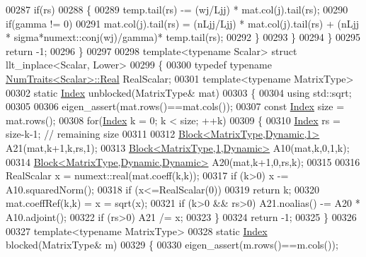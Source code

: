 \begin{DoxyCode}
00287       \textcolor{keywordflow}{if}(rs)
00288       \{
00289         temp.tail(rs) -= (wj/Ljj) * mat.col(j).tail(rs);
00290         \textcolor{keywordflow}{if}(gamma != 0)
00291           mat.col(j).tail(rs) = (nLjj/Ljj) * mat.col(j).tail(rs) + (nLjj * sigma*numext::conj(wj)/gamma)*
      temp.tail(rs);
00292       \}
00293     \}
00294   \}
00295   \textcolor{keywordflow}{return} -1;
00296 \}
00297 
00298 \textcolor{keyword}{template}<\textcolor{keyword}{typename} Scalar> \textcolor{keyword}{struct }llt\_inplace<Scalar, Lower>
00299 \{
00300   \textcolor{keyword}{typedef} \textcolor{keyword}{typename} \hyperlink{group___core___module_struct_eigen_1_1_num_traits}{NumTraits<Scalar>::Real} RealScalar;
00301   \textcolor{keyword}{template}<\textcolor{keyword}{typename} MatrixType>
00302   \textcolor{keyword}{static} \hyperlink{group___cholesky___module_ac7a64274814fa76e8b1e9e945546037f}{Index} unblocked(MatrixType& mat)
00303   \{
00304     \textcolor{keyword}{using} std::sqrt;
00305 
00306     eigen\_assert(mat.rows()==mat.cols());
00307     \textcolor{keyword}{const} \hyperlink{group___cholesky___module_ac7a64274814fa76e8b1e9e945546037f}{Index} size = mat.rows();
00308     \textcolor{keywordflow}{for}(\hyperlink{group___cholesky___module_ac7a64274814fa76e8b1e9e945546037f}{Index} k = 0; k < size; ++k)
00309     \{
00310       \hyperlink{group___cholesky___module_ac7a64274814fa76e8b1e9e945546037f}{Index} rs = size-k-1; \textcolor{comment}{// remaining size}
00311 
00312       \hyperlink{group___core___module_class_eigen_1_1_block}{Block<MatrixType,Dynamic,1>} A21(mat,k+1,k,rs,1);
00313       \hyperlink{group___core___module_class_eigen_1_1_block}{Block<MatrixType,1,Dynamic>} A10(mat,k,0,1,k);
00314       \hyperlink{group___core___module_class_eigen_1_1_block}{Block<MatrixType,Dynamic,Dynamic>} A20(mat,k+1,0,rs,k);
00315 
00316       RealScalar x = numext::real(mat.coeff(k,k));
00317       \textcolor{keywordflow}{if} (k>0) x -= A10.squaredNorm();
00318       \textcolor{keywordflow}{if} (x<=RealScalar(0))
00319         \textcolor{keywordflow}{return} k;
00320       mat.coeffRef(k,k) = x = sqrt(x);
00321       \textcolor{keywordflow}{if} (k>0 && rs>0) A21.noalias() -= A20 * A10.adjoint();
00322       \textcolor{keywordflow}{if} (rs>0) A21 /= x;
00323     \}
00324     \textcolor{keywordflow}{return} -1;
00325   \}
00326 
00327   \textcolor{keyword}{template}<\textcolor{keyword}{typename} MatrixType>
00328   \textcolor{keyword}{static} \hyperlink{group___cholesky___module_ac7a64274814fa76e8b1e9e945546037f}{Index} blocked(MatrixType& m)
00329   \{
00330     eigen\_assert(m.rows()==m.cols());

\end{DoxyCode}
